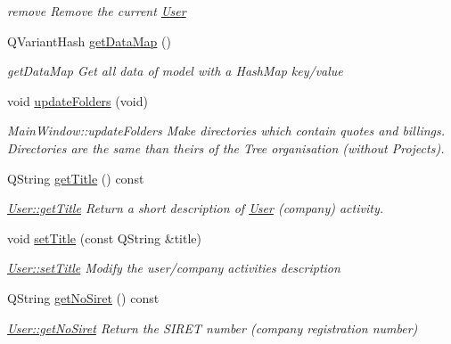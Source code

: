 \begin{DoxyCompactItemize}
\begin{DoxyCompactList}\small\item\em remove Remove the current \hyperlink{classModels_1_1User}{User} \end{DoxyCompactList}\item 
Q\+Variant\+Hash \hyperlink{classModels_1_1User_abbc8a3a40b527497872240bf39f21314}{get\+Data\+Map} ()
\begin{DoxyCompactList}\small\item\em get\+Data\+Map Get all data of model with a Hash\+Map key/value \end{DoxyCompactList}\item 
void \hyperlink{classModels_1_1User_ae61c862ac430d25b538601f343f7bf98}{update\+Folders} (void)
\begin{DoxyCompactList}\small\item\em Main\+Window\+::update\+Folders Make directories which contain quotes and billings. Directories are the same than theirs of the Tree organisation (without Projects). \end{DoxyCompactList}\item 
Q\+String \hyperlink{classModels_1_1User_a56a37a1b1125c28e8e72c9a3551b7da5}{get\+Title} () const 
\begin{DoxyCompactList}\small\item\em \hyperlink{classModels_1_1User_a56a37a1b1125c28e8e72c9a3551b7da5}{User\+::get\+Title} Return a short description of \hyperlink{classModels_1_1User}{User} (company) activity. \end{DoxyCompactList}\item 
void \hyperlink{classModels_1_1User_a0fe65ebdee17c2986c874e480e1cb0bd}{set\+Title} (const Q\+String \&title)
\begin{DoxyCompactList}\small\item\em \hyperlink{classModels_1_1User_a0fe65ebdee17c2986c874e480e1cb0bd}{User\+::set\+Title} Modify the user/company activities {\itshape description} \end{DoxyCompactList}\item 
Q\+String \hyperlink{classModels_1_1User_a617ee9ede3791842fbf8593f08660d37}{get\+No\+Siret} () const 
\begin{DoxyCompactList}\small\item\em \hyperlink{classModels_1_1User_a617ee9ede3791842fbf8593f08660d37}{User\+::get\+No\+Siret} Return the S\+I\+R\+E\+T number (company registration number) \end{DoxyCompactList}\item 

\end{DoxyCompactItemize}
